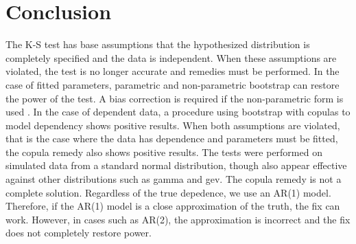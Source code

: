 \documentclass[12pt, letterpaper, titlepage]{article}
\begin{document}
\hypertarget{sec:conclusion}{%
\section{Conclusion}\label{sec:conclusion}}

The K-S test has base assumptions that the hypothesized distribution is completely specified
and the data is independent. When these assumptions are violated, the test is no
longer accurate and remedies must be performed. In the case of fitted parameters, 
parametric and non-parametric bootstrap can restore the power of the test. A bias 
correction is required if the non-parametric form is used \citep{Babu}. In the case of dependent
data, a procedure using bootstrap with copulas to model dependency shows positive results.
When both assumptions are violated, that is the case where the data has dependence and 
parameters must be fitted, the copula remedy also shows positive results. The tests were 
performed on simulated data from a standard normal distribution, though also appear effective
against other distributions such as gamma and gev. The copula remedy
is not a complete solution. Regardless of the true depedence, we use an AR(1) model.
Therefore, if the AR(1) model is a close approximation of the truth, the fix can work.
However, in cases such as AR(2), the approximation is incorrect and the fix does not 
completely restore power.




\end{document}
